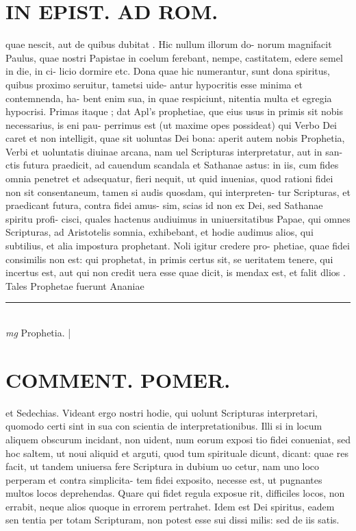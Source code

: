 \documentclass{article}
\begin{document}
\begin{pages}
\section*{IN EPIST. AD ROM.  }
\marginpar{[ p.144 ]}\pstart quae nescit, aut de quibus dubitat . Hic nullum illorum do- norum magnifacit Paulus, quae nostri Papistae in coelum ferebant, nempe, castitatem, edere semel in die, in ci- licio dormire etc. Dona quae hic numerantur, sunt dona spiritus, quibus proximo seruitur, tametsi uide- antur hypocritis esse minima et contemnenda, ha- bent enim sua, in quae respiciunt, nitentia multa et egregia hypocrisi. Primas itaque ; dat Apl's prophetiae, que eius usus in primis sit nobis necessarius, is eni pau- perrimus est (ut maxime opes possideat) qui Verbo Dei caret et non intelligit, quae sit uoluntas Dei bona: aperit autem nobis Prophetia, Verbi et uoluntatis diuinae arcana, nam uel Scripturas interpretatur, aut in san- ctis futura praedicit, ad cauendum scandala et Sathanae astus: in iis, cum fides omnia penetret et adsequatur, fieri nequit, ut quid inuenias, quod rationi fidei non sit consentaneum, tamen si audis quosdam, qui interpreten- tur Scripturas, et praedicant futura, contra fidei amus- sim, scias id non ex Dei, sed Sathanae spiritu profi- cisci, quales hactenus audiuimus in uniuersitatibus Papae, qui omnes Scripturas, ad Aristotelis somnia, exhibebant, et hodie audimus alios, qui subtilius, et alia impostura prophetant. Noli igitur credere pro- phetiae, quae fidei consimilis non est: qui prophetat, in primis certus sit, se ueritatem tenere, qui incertus est, aut qui non credit uera esse quae dicit, is mendax est, et falit dlios . Tales Prophetae fuerunt Ananiae  \pend
\vspace{0.5cm}\noindent
\vspace{0.2cm}\rule{1cm}{0.2pt}\\ 
\hspace{0.2cm}\textit{mg}
\footnotesize Prophetia.  
\normalsize| 
\section*{COMMENT. POMER.  }\pstart et Sedechias. Videant ergo nostri hodie, qui uolunt Scripturas interpretari, quomodo certi sint in sua con scientia de interpretationibus. Illi si in locum aliquem obscurum incidant, non uident, num eorum exposi tio fidei conueniat, sed hoc saltem, ut noui aliquid et arguti, quod tum spirituale dicunt, dicant: quae res facit, ut tandem uniuersa fere Scriptura in dubium uo cetur, nam uno loco perperam et contra simplicita- tem fidei exposito, necesse est, ut pugnantes multos locos deprehendas. Quare qui fidet regula exposue rit, difficiles locos, non errabit, neque alios quoque in errorem pertrahet. Idem est Dei spiritus, eadem sen tentia per totam Scripturam, non potest esse sui dissi milis: sed de iis satis.  \pend
{}
{}

\end{pages}
\end{document}
